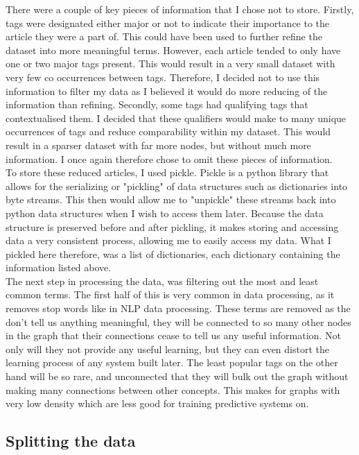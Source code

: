 \documentclass{l4proj}
\begin{document}
There were a couple of key pieces of information that I chose not to store. Firstly, tags were designated either major or not to indicate their importance to the article they were a part of. This could have been used to further refine the dataset into more meaningful terms. However, each article tended to only have one or two major tags present. This would result in a very small dataset with very few co occurrences between tags. Therefore, I decided not to use this information to filter my data as I believed it would do more reducing of the information than refining. Secondly, some tags had qualifying tags that contextualised them. I decided that these qualifiers would make to many unique occurrences of tags and reduce comparability within my dataset. This would result in a sparser dataset with far more nodes, but without much more information. I once again therefore chose to omit these pieces of information.\\

To store these reduced articles, I used pickle. Pickle is a python library that allows for the serializing or "pickling" of data structures such as dictionaries into byte streams. This then would allow me to "unpickle" these streams back into python data structures when I wish to access them later. Because the data structure is preserved before and after pickling, it makes storing and accessing data a very consistent process, allowing me to easily access my data. What I pickled here therefore, was a list of dictionaries, each dictionary containing the information listed above.\\

The next step in processing the data, was filtering out the most and least common terms. The first half of this is very common in data processing, as it removes stop words like in NLP data processing. These terms are removed as the don't tell us anything meaningful, they will be connected to so many other nodes in the graph that their connections cease to tell us any useful information. Not only will they not provide any useful learning, but they can even distort the learning process of any system built later. The least popular tags on the other hand will be so rare, and unconnected that they will bulk out the graph without making many connections between other concepts. This makes for graphs with very low density which are less good for training predictive systems on.\\

\subsection{Splitting the data}
\end{document}
